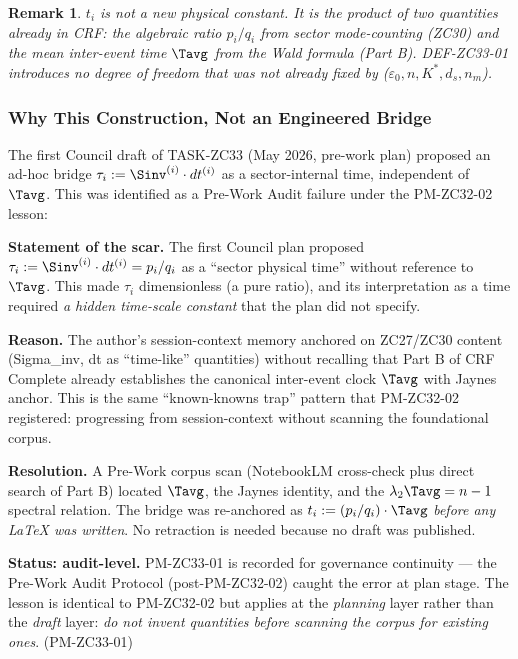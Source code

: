 \documentclass[12pt, a4paper]{article}
\newtheorem{remark}{Remark}[section]
\begin{document}
\begin{remark}
$t_i$ is \emph{not} a new physical constant. It is the
product of two quantities already in CRF: the algebraic
ratio $p_i/q_i$ from sector mode-counting (ZC30) and the
mean inter-event time $\Tavg$ from the Wald formula (Part B).
DEF-ZC33-01 introduces no degree of freedom that was not
already fixed by ($\varepsilon_0, n, K^*, d_s, n_m$).
\end{remark}

\subsubsection{Why This Construction, Not an Engineered Bridge}

The first Council draft of TASK-ZC33 (May 2026, pre-work
plan) proposed an ad-hoc bridge $\tau_i := \Sinv^{(i)}\cdot
dt^{(i)}$ as a sector-internal time, independent of $\Tavg$.
This was identified as a Pre-Work Audit failure under the
PM-ZC32-02 lesson:

\begin{openqbox}[title={PM-ZC33-01 (audit-level): Plan-v1
  proposed an engineered bridge $\tau_i$}]
\textbf{Statement of the scar.}
The first Council plan proposed
$\tau_i := \Sinv^{(i)}\cdot dt^{(i)} = p_i/q_i$ as a
``sector physical time'' without reference to $\Tavg$. This
made $\tau_i$ dimensionless (a pure ratio), and its
interpretation as a time required \emph{a hidden time-scale
constant} that the plan did not specify.

\textbf{Reason.}
The author's session-context memory anchored on ZC27/ZC30
content (Sigma\_inv, dt as ``time-like'' quantities) without
recalling that Part B of CRF Complete already establishes
the canonical inter-event clock $\Tavg$ with Jaynes anchor.
This is the same ``known-knowns trap'' pattern that
PM-ZC32-02 registered: progressing from session-context
without scanning the foundational corpus.

\textbf{Resolution.}
A Pre-Work corpus scan (NotebookLM cross-check plus direct
search of Part B) located $\Tavg$, the Jaynes identity, and
the $\lambda_2 \Tavg = n-1$ spectral relation. The bridge
was re-anchored as $t_i := (p_i/q_i)\cdot\Tavg$ \emph{before
any LaTeX was written}. No retraction is needed because no
draft was published.

\textbf{Status: audit-level.}
PM-ZC33-01 is recorded for governance continuity --- the
Pre-Work Audit Protocol (post-PM-ZC32-02) caught the error
at plan stage. The lesson is identical to PM-ZC32-02 but
applies at the \emph{planning} layer rather than the
\emph{draft} layer: \emph{do not invent quantities before
scanning the corpus for existing ones}.
\hfill\textup{(PM-ZC33-01)}
\end{openqbox}
\end{document}
